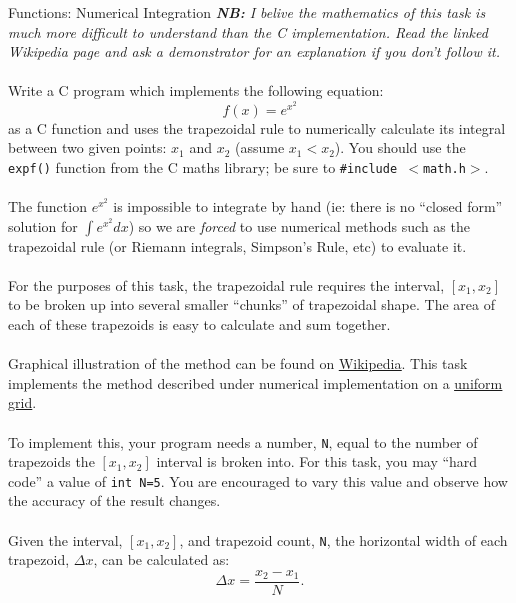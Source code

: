 \documentclass{lab}
\begin{document}
\pagebreak
\begin{task}{Functions: Numerical Integration}{}
\textit{\textbf{NB:} I belive the mathematics of this task is much more difficult to understand than the C implementation. Read the linked Wikipedia page and ask a demonstrator for an explanation if you don't follow it.} \\
~\\
Write a C program which implements the following equation:
\begin{equation*}
f(x) = e^{x^2}
\end{equation*}
as a C function and uses the trapezoidal rule to numerically calculate its integral between two given points: $x_1$ and $x_2$ (assume $x_1 < x_2$). You should use the \texttt{expf()} function from the C maths library; be sure to \texttt{\#include $<$math.h$>$}.
\\~\\
The function $e^{x^2}$ is impossible to integrate by hand (ie: there is no ``closed form'' solution for $\int e^{x^2} dx$) so we are \textit{forced} to use numerical methods such as the trapezoidal rule (or Riemann integrals, Simpson's Rule, etc) to evaluate it.
\\~\\
For the purposes of this task, the trapezoidal rule requires the interval, $[x_1, x_2]$ to be broken up into several smaller ``chunks'' of trapezoidal shape. The area of each of these trapezoids is easy to calculate and sum together.
\\~\\
Graphical illustration of the method can be found on \underline{\href{https://en.wikipedia.org/wiki/Trapezoidal_rule}{Wikipedia}}. This task implements the method described under numerical implementation on a \underline{\href{https://en.wikipedia.org/wiki/Trapezoidal_rule\#Uniform_grid}{uniform grid}}.
\\~\\
To implement this, your program needs a number, \texttt{N}, equal to the number of trapezoids the $[x_1, x_2]$ interval is broken into. For this task, you may ``hard code'' a value of \texttt{int N=5}. You are encouraged to vary this value and observe how the accuracy of the result changes.
\\~\\
Given the interval, $[x_1, x_2]$, and trapezoid count, \texttt{N}, the horizontal width of each trapezoid, $\Delta x$, can be calculated as:
\begin{equation}
\Delta x = \frac{x_2 - x_1}{N}.
\end{equation}


\end{task}
\end{document}
